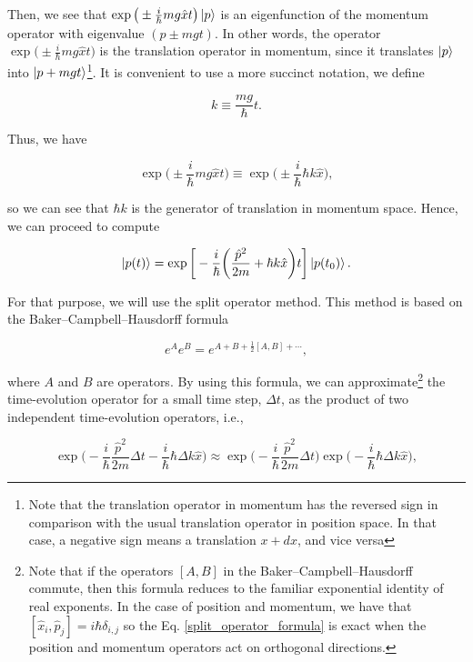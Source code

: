 \documentclass{article}
\begin{document}
Then, we see that $\exp \big(\pm \frac{i}{\hbar} mg \hat{x} t \big) \ket{p}$ is an eigenfunction of the momentum operator with eigenvalue $(p\pm mgt)$. In other words, the operator $\exp \big(\pm \frac{i}{\hbar} mg \hat{x} t \big)$ is the translation operator in momentum, since it translates $\ket{p}$ into $\ket{p+mgt}$\footnote{Note that the translation operator in momentum has the reversed sign in comparison with the usual translation operator in position space. In that case, a negative sign means a translation $x+dx$, and vice versa}. It is convenient to use a more succinct notation, we define

\begin{equation}
    k \equiv \frac{mg}{\hbar} t.
\end{equation}

Thus, we have

\begin{equation}
    \exp \bigg(\pm \frac{i}{\hbar} mg \hat{x} t \bigg) \equiv \exp \bigg(\pm \frac{i}{\hbar} \hbar k \hat{x} \bigg),
\end{equation}

so we can see that $\hbar k$ is the generator of translation in momentum space. Hence, we can proceed to compute

\begin{equation}
    \ket{p(t)} = \exp \bigg[-\frac{i}{\hbar} \bigg( \frac{\hat{p}^{2}}{2m} + \hbar k \hat{x} \bigg) t \bigg] \ket{p(t_{0})}.
\end{equation}

For that purpose, we will use the split operator method. This method is based on the Baker–Campbell–Hausdorff formula

\begin{equation}
    e^{A}e^{B} = e^{A+B+\frac{1}{2}[A, B] + \cdots},
\end{equation}

where $A$ and $B$ are operators. By using this formula, we can approximate\footnote{Note that if the operators $[A,B]$ in the Baker–Campbell–Hausdorff commute, then this formula reduces to the familiar exponential identity of real exponents. In the case of position and momentum, we have that $[\hat{x}_{i},\hat{p}_{j}]=i\hbar \delta_{i,j}$ so the Eq. \ref{split_operator_formula} is exact when the position and momentum operators act on orthogonal directions.} the time-evolution operator for a small time step, $\Delta t$, as the product of two independent time-evolution operators, i.e.,

\begin{equation}\label{split_operator_formula}
    \exp \bigg(-\frac{i}{\hbar} \frac{\hat{p}^{2}}{2m} \Delta t - \frac{i}{\hbar} \hbar \Delta k \hat{x} \bigg) \approx \exp \bigg( -\frac{i}{\hbar} \frac{\hat{p}^{2}}{2m} \Delta t \bigg) \exp \bigg(- \frac{i}{\hbar} \hbar \Delta k \hat{x} \bigg),
\end{equation}
\end{document}
